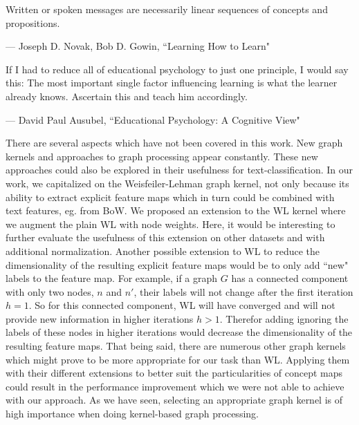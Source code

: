 

\epigraph{Written or spoken messages are necessarily linear sequences of concepts and propositions.}{--- \textup{Joseph D.  Novak, Bob D. Gowin}, ``Learning How to Learn" \cite[p.~54]{Novak1984}}
\epigraph{If I had to reduce all of educational psychology to just one principle, I would say this: The most important single factor influencing learning is what the learner already knows. Ascertain this and teach him accordingly.}{--- \textup{David Paul Ausubel}, ``Educational Psychology: A Cognitive View" \cite{Ausubel1968}}

There are several aspects which have not been covered in this work.
New graph kernels and approaches to graph processing appear constantly.
These new approaches could also be explored in their usefulness for text-classification.
In our work, we capitalized on the Weisfeiler-Lehman graph kernel, not only because its ability to extract explicit feature maps which in turn could be combined with text features, eg. from BoW.
We proposed an extension to the WL kernel where we augment the plain WL with node weights. Here, it would be interesting to further evaluate the usefulness of this extension on other datasets and with additional normalization.
Another possible extension to WL to reduce the dimensionality of the resulting explicit feature maps would be to only add ``new" labels to the feature map.
For example, if a graph $G$ has a connected component with only two nodes, $n$ and $n'$, their labels will not change after the first iteration $h=1$.
So for this connected component, WL will have converged and will not provide new information in higher iterations $h > 1$.
Therefor adding ignoring the labels of these nodes in higher iterations would decrease the dimensionality of the resulting feature maps.
That being said, there are numerous other graph kernels which might prove to be more appropriate for our task than WL.
Applying them with their different extensions to better suit the particularities of concept maps could result in the performance improvement which we were not able to achieve with our approach.
As we have seen, selecting an appropriate graph kernel is of high importance when doing kernel-based graph processing.

